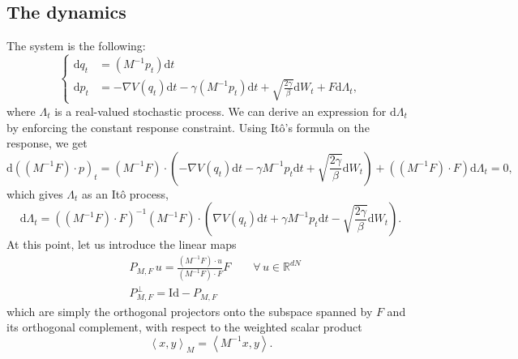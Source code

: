 \documentclass[a4paper,10pt,twoside,leqno]{report}
\newcommand{\R}{\mathbb{R}}
\newcommand{\Id}{\mathrm{Id}}
\newcommand{\dif}{\mathrm{d}}
\newcommand{\1}{\mathbbm{1}}
\begin{document}
    \subsection{The dynamics}
    The system is the following:
    \begin{equation}
        \label{eq:norton_method}
        \left\{\begin{aligned}
            \dif q_t&=\left(M^{-1}p_t\right)\dif t\\
            \dif p_t&=-\nabla V(q_t)\dif t -\gamma\left(M^{-1}p_t\right)\dif t+\sqrt{\frac{2\gamma}\beta}\dif W_t+F\dif \Lambda_t,
        \end{aligned}\right.
    \end{equation}
    where $\Lambda_t$ is a real-valued stochastic process. We can derive an expression for $\dif \Lambda_t$ by enforcing the constant response constraint.
    Using Itô's formula on the response, we get
    \begin{equation}
        \label{eq:formula_response}
    \dif \left(\left(M^{-1}F\right)\cdot p\right)_t=\left(M^{-1}F\right)\cdot\left(-\nabla V(q_t)\dif t -\gamma M^{-1}p_t\dif t+\sqrt{\frac{2\gamma}\beta}\dif W_t\right)+\left( \left(M^{-1}F\right)\cdot F\right)\dif\Lambda_t=0,
    \end{equation}
    which gives $\Lambda_t$ as an Itô process,
    \begin{equation}
        \label{eq:norton_multiplier_ito_decomposition}
        \dif \Lambda_t=\left( \left(M^{-1}F\right)\cdot F\right)^{-1}\left(M^{-1}F\right)\cdot\left(\nabla V(q_t)\dif t +\gamma M^{-1}p_t\dif t-\sqrt{\frac{2\gamma}\beta}\dif W_t\right).
    \end{equation}
    At this point, let us introduce the linear maps
    \begin{equation}
        \label{eq:norton_projector}
        \begin{aligned}
            &P_{M,F}\,u=\frac{\left(M^{-1}F\right)\cdot u}{\left(M^{-1}F\right)\cdot F}F\qquad\forall\,u\in\R^{dN}\\
            &P_{M,F}^\perp=\Id-P_{M,F}
        \end{aligned}
    \end{equation}
    which are simply the orthogonal projectors onto the subspace spanned by $F$ and its orthogonal complement, with respect to the weighted scalar product
    \begin{equation}
        \label{eq:norton_weighted_scalar_product}
        \left\langle x,y\right\rangle_{M}=\left\langle M^{-1}x,y\right\rangle.
    \end{equation}
\end{document}
